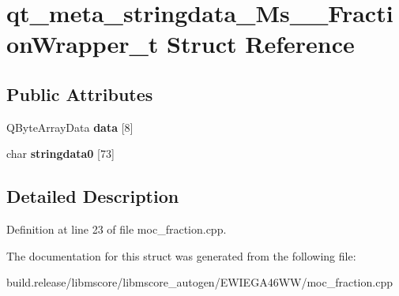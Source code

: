\hypertarget{structqt__meta__stringdata___ms_____fraction_wrapper__t}{}\section{qt\+\_\+meta\+\_\+stringdata\+\_\+\+Ms\+\_\+\+\_\+\+Fraction\+Wrapper\+\_\+t Struct Reference}
\label{structqt__meta__stringdata___ms_____fraction_wrapper__t}
\subsection*{Public Attributes}
\begin{DoxyCompactItemize}
\item 
\mbox{\label{structqt__meta__stringdata___ms_____fraction_wrapper__t_a38ebb8e67f13d0e99696e67cfd38b5be}} 
Q\+Byte\+Array\+Data {\bfseries data} \mbox{[}8\mbox{]}
\item 
\mbox{\label{structqt__meta__stringdata___ms_____fraction_wrapper__t_ad3054f2af19d01eeeae069323054729c}} 
char {\bfseries stringdata0} \mbox{[}73\mbox{]}
\end{DoxyCompactItemize}


\subsection{Detailed Description}


Definition at line 23 of file moc\+\_\+fraction.\+cpp.



The documentation for this struct was generated from the following file\+:\begin{DoxyCompactItemize}
\item 
build.\+release/libmscore/libmscore\+\_\+autogen/\+E\+W\+I\+E\+G\+A46\+W\+W/moc\+\_\+fraction.\+cpp\end{DoxyCompactItemize}
